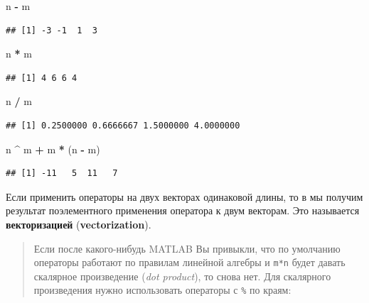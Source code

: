 \documentclass[]{book}
\newenvironment{Shaded}{\begin{snugshade}}{\end{snugshade}}
\newcommand{\StringTok}[1]{\textcolor[rgb]{0.31,0.60,0.02}{#1}}
\newcommand{\OperatorTok}[1]{\textcolor[rgb]{0.81,0.36,0.00}{\textbf{#1}}}
\newcommand{\NormalTok}[1]{#1}
\begin{document}
\begin{Shaded}
\begin{Highlighting}[]
\NormalTok{n }\OperatorTok{-}\StringTok{ }\NormalTok{m}
\end{Highlighting}
\end{Shaded}

\begin{verbatim}
## [1] -3 -1  1  3
\end{verbatim}

\begin{Shaded}
\begin{Highlighting}[]
\NormalTok{n }\OperatorTok{*}\StringTok{ }\NormalTok{m}
\end{Highlighting}
\end{Shaded}

\begin{verbatim}
## [1] 4 6 6 4
\end{verbatim}

\begin{Shaded}
\begin{Highlighting}[]
\NormalTok{n }\OperatorTok{/}\StringTok{ }\NormalTok{m}
\end{Highlighting}
\end{Shaded}

\begin{verbatim}
## [1] 0.2500000 0.6666667 1.5000000 4.0000000
\end{verbatim}

\begin{Shaded}
\begin{Highlighting}[]
\NormalTok{n }\OperatorTok{^}\StringTok{ }\NormalTok{m }\OperatorTok{+}\StringTok{ }\NormalTok{m }\OperatorTok{*}\StringTok{ }\NormalTok{(n }\OperatorTok{-}\StringTok{ }\NormalTok{m)}
\end{Highlighting}
\end{Shaded}

\begin{verbatim}
## [1] -11   5  11   7
\end{verbatim}

Если применить операторы на двух векторах одинаковой длины, то в мы
получим результат поэлементного применения оператора к двум векторам.
Это называется \textbf{векторизацией} (\textbf{vectorization}).

\begin{quote}
Если после какого-нибудь MATLAB Вы привыкли, что по умолчанию операторы
работают по правилам линейной алгебры и \texttt{m*n} будет давать
скалярное произведение (\emph{dot product}), то снова нет. Для
скалярного произведения нужно использовать операторы с \texttt{\%} по
краям:
\end{quote}
\end{document}
